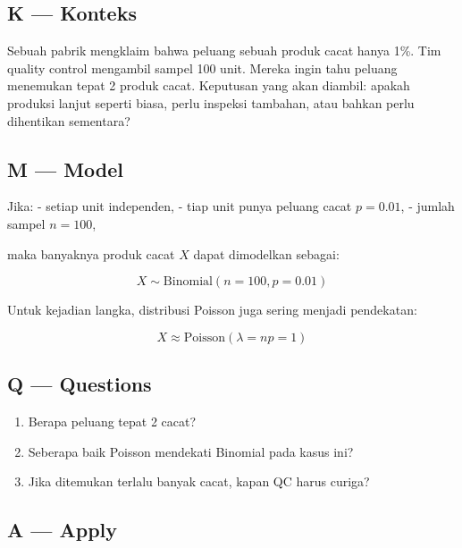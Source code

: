 \documentclass[
  letterpaper,
  DIV=11,
  numbers=noendperiod]{scrreprt}
\providecommand{\tightlist}{%
  \setlength{\itemsep}{0pt}\setlength{\parskip}{0pt}}
\begin{document}
\subsection{K --- Konteks}\label{k-konteks-2}

Sebuah pabrik mengklaim bahwa peluang sebuah produk cacat hanya 1\%. Tim
quality control mengambil sampel 100 unit. Mereka ingin tahu peluang
menemukan tepat 2 produk cacat. Keputusan yang akan diambil: apakah
produksi lanjut seperti biasa, perlu inspeksi tambahan, atau bahkan
perlu dihentikan sementara?

\subsection{M --- Model}\label{m-model-2}

Jika: - setiap unit independen, - tiap unit punya peluang cacat
\(p = 0.01\), - jumlah sampel \(n = 100\),

maka banyaknya produk cacat \(X\) dapat dimodelkan sebagai:

\[
X \sim \mathrm{Binomial}(n=100, p=0.01)
\]

Untuk kejadian langka, distribusi Poisson juga sering menjadi
pendekatan:

\[
X \approx \mathrm{Poisson}(\lambda = np = 1)
\]

\subsection{Q --- Questions}\label{q-questions-2}

\begin{enumerate}
\def\labelenumi{\arabic{enumi}.}
\tightlist
\item
  Berapa peluang tepat 2 cacat?
\item
  Seberapa baik Poisson mendekati Binomial pada kasus ini?
\item
  Jika ditemukan terlalu banyak cacat, kapan QC harus curiga?
\end{enumerate}

\subsection{A --- Apply}\label{a-apply-2}
\end{document}
